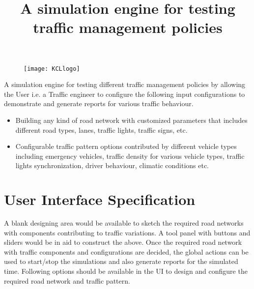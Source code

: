\documentclass[11pt]{article}
\begin{document}

\begin{figure}[t]
\texttt{[image: KCLlogo]}
\centering
\end{figure}


\title{A simulation engine for testing traffic management policies}

\maketitle

A simulation engine for testing different traffic management policies by allowing the User i.e. a Traffic engineer to configure the following input configurations to demonstrate and generate reports for various traffic behaviour. 
\begin{itemize}
	\item Building any kind of road network with customized parameters that includes different road types, lanes, traffic lights, traffic signs, etc.
	\item Configurable traffic pattern options contributed by different vehicle types including emergency vehicles, traffic density for various vehicle types, traffic lights synchronization, driver behaviour, climatic conditions etc.
\end{itemize}

\section{User Interface Specification}	
A blank designing area would be available to sketch the required road networks with components contributing to traffic variations. A tool panel with buttons and sliders would be in aid to construct the above. Once the required road network with traffic components and configurations are decided, the global actions can be used to start/stop the simulations and also generate reports for the simulated time. Following options should be available in the UI to design and configure the required road network and traffic pattern.
	
\end{document}
